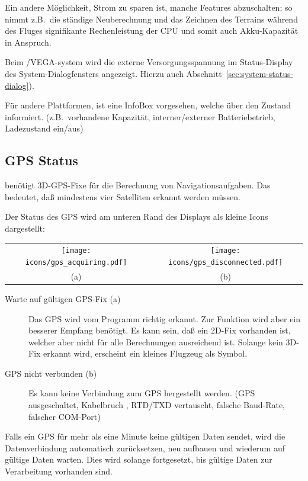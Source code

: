 Ein andere Möglichkeit, Strom zu sparen ist, manche Features abzuschalten; so nimmt z.B.\ die ständige Neuberechnung und das Zeichnen des Terrains während des Fluges signifikante Rechenleistung der CPU und somit auch Akku-Kapazität in Anspruch.

Beim \al/VEGA-system wird die externe Versorgungsspannung im Status-Display des System-Dialogfensters angezeigt.  Hierzu auch Abschnitt~\ref{sec:system-status-dialog}).

Für andere Plattformen, ist eine  InfoBox vorgesehen, welche über den Zustand informiert.
(z.B.\ vorhandene Kapazität, interner/externer Batteriebetrieb, Ladezustand ein/aus)

\subsection*{GPS Status}

\xc benötigt 3D-GPS-Fixe für die Berechnung von Navigationsaufgaben. Das bedeutet, daß mindestens vier Satelliten erkannt werden müssen.

Der Status des GPS wird am unteren Rand des Displays als kleine Icons dargestellt:

\begin{tabular}{c c}%
\texttt{[image: icons/gps\_acquiring.pdf]} & \texttt{[image: icons/gps\_disconnected.pdf]}\\
(a) & (b)
\end{tabular}

\begin{description}
\item[Warte auf gültigen GPS-Fix (a)]  Das GPS wird vom Programm richtig erkannt. Zur Funktion wird aber ein besserer Empfang benötigt. Es kann sein, daß ein 2D-Fix vorhanden ist, welcher aber nicht für alle Berechnungen ausreichend ist. Solange kein 3D-Fix erkannt wird, erscheint ein kleines Flugzeug als Symbol.

\item[GPS nicht verbunden (b)]  Es kann keine Verbindung zum GPS hergestellt werden.
 (GPS ausgeschaltet, Kabelbruch , RTD/TXD vertauscht, falsche Baud-Rate, falscher COM-Port)
\end{description}

Falls ein GPS für mehr als eine Minute keine gültigen Daten sendet, wird \xc die Datenverbindung automatisch zurücksetzen, neu aufbauen und wiederum auf gültige Daten warten. Dies wird solange fortgesetzt, bis gültige Daten zur Verarbeitung vorhanden sind. 


